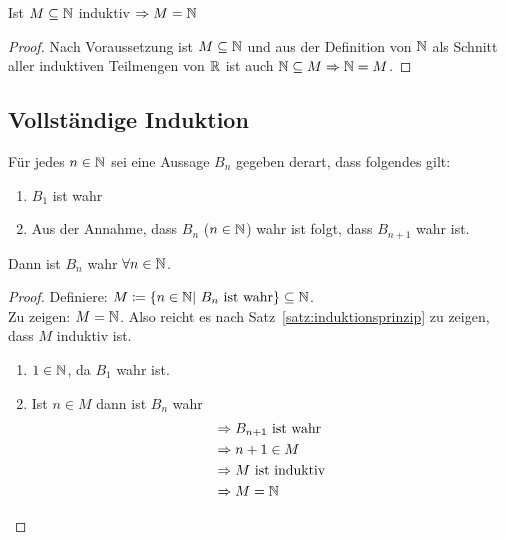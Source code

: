 \begin{satz}[Induktionsprinzip]
    \label{satz:induktionsprinzip}
    Ist $M\subseteq \mathbb{N}$ induktiv $\Rightarrow{} M = \mathbb{N}$
    \begin{proof}
        Nach Voraussetzung ist $M\subseteq \mathbb{N}$ und aus der Definition von $\mathbb{N}$ als Schnitt aller induktiven Teilmengen von $\mathbb{R}$ ist auch $\mathbb{N}\subseteq M \Rightarrow{} \mathbb{N} = M$.
    \end{proof}
\end{satz}

\newpage


\subsection{Vollständige Induktion}

\begin{satz}[Induktionsbeweis]
    \marginnote{[9. Nov]}
    Für jedes $n\in\mathbb{N}$ sei eine Aussage $B_n$ gegeben derart, dass folgendes gilt:
    \begin{enumerate}
        \item $B_1$ ist wahr
        \item Aus der Annahme, dass $B_n$ ($n\in\mathbb{N}$) wahr ist folgt, dass $B_{n+1}$ wahr ist.
    \end{enumerate}
    Dann ist $B_n$ wahr $\forall n\in\mathbb{N}$.
    \begin{proof}
        Definiere: $M\coloneqq\left\{n\in\mathbb{N}|~B_n\text{ ist wahr}\right\} \subseteq \mathbb{N}$.\\
        Zu zeigen: $M=\mathbb{N}$. Also reicht es nach Satz~\ref{satz:induktionsprinzip} zu zeigen, dass $M$ induktiv ist.
        \begin{enumerate}
            \item $1\in\mathbb{N}$, da $B_1$ wahr ist.
            \item Ist $n\in M$ dann ist $B_n$ wahr
            \begin{align*}
                &\Rightarrow{} B_{n+1} \text{ ist wahr }\\
                &\Rightarrow{} n+1\in M\\
                &\Rightarrow{} M \text{ ist induktiv } \\
                &\Rightarrow{} M = \mathbb{N}\qedhere
            \end{align*}
        \end{enumerate}
    \end{proof}
\end{satz}

